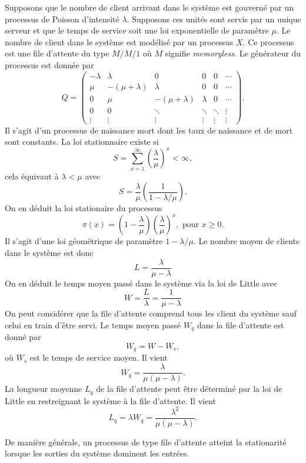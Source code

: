 \begin{ex}
Supposons que le nombre de client arrivant dans le système est gouverné par un processus de Poisson d'intensité $\lambda$. Supposons ces unités sont servis par un unique serveur et que le temps de service soit une loi exponentielle de paramètre $\mu$. Le nombre de client dans le système est modélisé par un processus $X$. Ce processus est une file d'attente du type $M/M/1$ où $M$ signifie \textit{memoryless}. Le générateur du processus est donnée par 
$$
Q=\left(
\begin{array}{ccccccc}
-\lambda&\lambda&0&0&0&\cdots \\
\mu&-(\mu +\lambda)&\lambda&0&0&\cdots \\
0&\mu&-(\mu +\lambda)&\lambda&0&\cdots \\
0&0&\ddots&\ddots&\ddots &\vdots \\
\vdots&\vdots&\vdots&\vdots&\vdots&\vdots
\end{array}
\right).
$$
Il s'agit d'un processus de naissance mort dont les taux de naissance et de mort sont constants. La loi stationnaire existe si 
$$
S = \sum_{x = 1}^\infty\left(\frac{\lambda}{\mu}\right)^x <\infty,
$$
cela équivaut à $\lambda <\mu$ avec 
$$
S = \frac{\lambda}{\mu}\left(\frac{1}{1-\lambda / \mu}\right).
$$
On en déduit la loi stationaire du processus 
$$
\pi(x) = \left(1-\frac{\lambda}{\mu}\right)\left(\frac \lambda\mu\right)^x,\text{ pour }x\geq 0.
$$
Il s'agit d'une loi géométrique de paramètre $1-\lambda / \mu$. Le nombre moyen de clients dans le système est donc 
$$
L = \frac{\lambda}{\mu - \lambda}
$$
On en déduit le temps moyen passé dans le système via la loi de Little avec 
$$
W = \frac{L}{\lambda} = \frac{1}{\mu - \lambda}
$$
On peut considérer que la file d'attente comprend tous les client du système sauf celui en train d'être servi. Le temps moyen passé $W_q$ dans la file d'attente est donné par
$$
W_q = W - W_s, 
$$
où $W_s$ est le temps de service moyen. Il vient 
$$
W_q= \frac{\lambda}{\mu(\mu-\lambda)}.
$$
La longueur moyenne $L_q$ de la file d'attente peut être déterminé par la loi de Little en restreignant le système à la file d'attente. Il vient 
$$
L_q = \lambda W_q = \frac{\lambda^2}{\mu(\mu - \lambda)}.
$$


\end{ex}
De manière générale, un processus de type file d'attente atteint la stationarité lorsque les sorties du système dominent les entrées.
